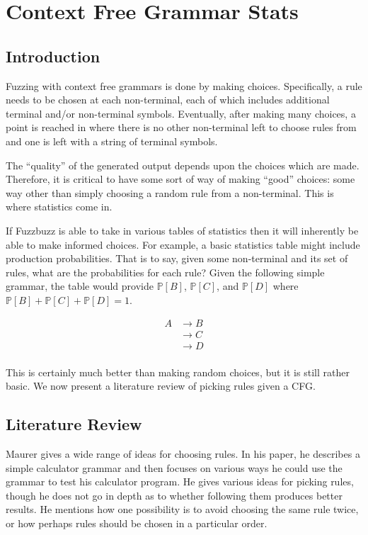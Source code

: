 \section{Context Free Grammar Stats}
\label{cfgstats}
\subsection{Introduction}
Fuzzing with context free grammars is done by making choices. Specifically, a
rule needs to be chosen at each non-terminal, each of which includes additional
terminal and/or non-terminal symbols. Eventually, after making many choices, a
point is reached in where there is no other non-terminal left to choose rules
from and one is left with a string of terminal symbols.

The ``quality'' of the generated output depends upon the choices
which are made. Therefore, it is critical to have some sort of way of making
``good'' choices: some way other than simply choosing a random rule from a
non-terminal. This is where statistics come in.

If Fuzzbuzz is able to take in various tables of statistics then it will
inherently be able to make informed choices. For example, a basic statistics
table might include production probabilities. That is to say, given some
non-terminal and its set of rules, what are the probabilities for each rule?
Given the following simple grammar, the table would provide $\mathbb{P}[B]$,
$\mathbb{P}[C]$, and $\mathbb{P}[D]$ where $\mathbb{P}[B] + \mathbb{P}[C] +
\mathbb{P}[D] = 1$.

\begin{align*}
A &\rightarrow B \\
&\rightarrow C \\
&\rightarrow D \\
\end{align*}

\noindent
This is certainly much better than making random choices, but it is still
rather basic. We now present a literature review of picking rules given a CFG.

\subsection{Literature Review}

Maurer\cite{Maurer1990} gives a wide range of ideas for choosing rules. In his
paper, he describes a simple calculator grammar and then focuses on various
ways he could use the grammar to test his calculator program. He gives various
ideas for picking rules, though he does not go in depth as to whether following
them produces better results. He mentions how one possibility is to avoid
choosing the same rule twice, or how perhaps rules should be chosen in a
particular order.

